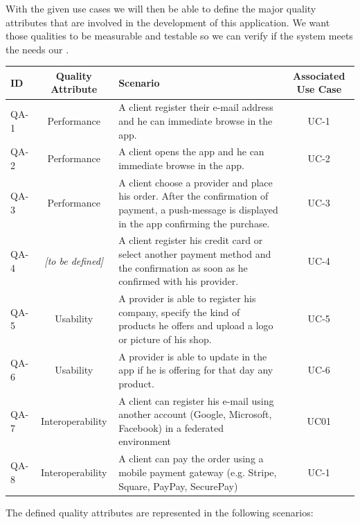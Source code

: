 With the given use cases we will then be able to define the major quality attributes that are involved in the 
development of this application. We want those qualities to be measurable and testable so we can verify if the 
system meets the needs our  \cite{refbook:DSHC}.

\begin{table}[H]
    \begin{tabularx}{\textwidth}{lcXc}
        \toprule
        ID & Quality Attribute & Scenario & Associated Use Case  \\
        \midrule
        QA-1 & Performance & A \gls{client} register their e-mail address and he can immediate browse in the app. & UC-1 \\
        QA-2 & Performance & A \gls{client} opens the app and he can immediate browse in the app. & UC-2 \\
        QA-3 & Performance & A \gls{client} choose a \gls{provider} and place his order. After the confirmation
        of payment, a push-message is displayed in the app confirming the purchase. & UC-3 \\
        QA-4 & \textit{[to be defined]} & A \gls{client}  register his credit card or select another payment method and the
        confirmation as soon as he confirmed with his \gls{provider}. & UC-4 \\
        QA-5 & Usability & A \gls{provider} is able to register his company, specify the kind of products he offers and upload
        a logo or picture of his shop. & UC-5 \\
        QA-6 & Usability & A \gls{provider} is able to update in the app if he is offering for that day any product. &  UC-6 \\
        QA-7 & Interoperability & A \gls{client} can register his e-mail using another account (Google, Microsoft, Facebook)
        in a federated environment & UC01 \\
        QA-8 & Interoperability & A \gls{client} can pay the order using a \gls{mobile payment gateway} (e.g. Stripe, Square, PayPay, 
        SecurePay) & UC-1 \\
        \bottomrule
    \end{tabularx}
\end{table}

\newpage
The defined quality attributes are represented in the following scenarios:

